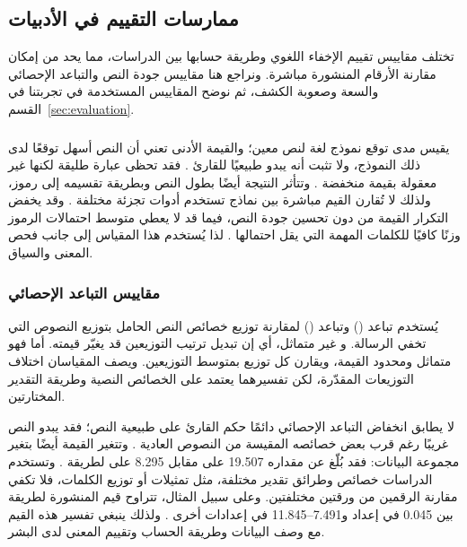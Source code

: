 \subsection{ممارسات التقييم في الأدبيات}
\label{sec:related-rq3}

تختلف مقاييس تقييم الإخفاء اللغوي وطريقة حسابها بين الدراسات، مما يحد من إمكان مقارنة الأرقام المنشورة مباشرة. ونراجع هنا مقاييس جودة النص والتباعد الإحصائي والسعة وصعوبة الكشف، ثم نوضح المقاييس المستخدمة في تجربتنا في القسم~\ref{sec:evaluation}.

\subsubsection{}

يقيس  مدى توقع نموذج لغة لنص معين؛ والقيمة الأدنى تعني أن النص أسهل توقعًا لدى ذلك النموذج، ولا تثبت أنه يبدو طبيعيًا للقارئ \cite{jelinek1977perplexity}. فقد تحظى عبارة طليقة لكنها غير معقولة بقيمة منخفضة \cite{wang2022perplexity}. وتتأثر النتيجة أيضًا بطول النص وبطريقة تقسيمه إلى رموز، ولذلك لا تُقارن القيم مباشرة بين نماذج تستخدم أدوات تجزئة مختلفة \cite{fang2025wrong,morgan2024perplexity}. وقد يخفض التكرار القيمة من دون تحسين جودة النص، فيما قد لا يعطي متوسط احتمالات الرموز وزنًا كافيًا للكلمات المهمة التي يقل احتمالها \cite{wang2022perplexity,fang2025wrong}. لذا يُستخدم هذا المقياس إلى جانب فحص المعنى والسياق.

\subsubsection{مقاييس التباعد الإحصائي}

يُستخدم تباعد  ‏() \cite{1320776d-9e76-337e-a755-73010b6e4b64} وتباعد  ‏() لمقارنة توزيع خصائص النص الحامل بتوزيع النصوص التي تخفي الرسالة. و غير متماثل، أي إن تبديل ترتيب التوزيعين قد يغيّر قيمته. أما  فهو متماثل ومحدود القيمة، ويقارن كل توزيع بمتوسط التوزيعين. ويصف المقياسان اختلاف التوزيعات المقدّرة، لكن تفسيرهما يعتمد على الخصائص النصية وطريقة التقدير المختارتين.

لا يطابق انخفاض التباعد الإحصائي دائمًا حكم القارئ على طبيعية النص؛ فقد يبدو النص غريبًا رغم قرب بعض خصائصه المقيسة من النصوص العادية \cite{yang2020vae}. وتتغير القيمة أيضًا بتغير مجموعة البيانات: فقد بُلّغ عن  مقداره 19.507 على  مقابل 8.295 على  لطريقة  \cite{yang2020vae}. وتستخدم الدراسات خصائص وطرائق تقدير مختلفة، مثل تمثيلات  أو توزيع الكلمات، فلا تكفي مقارنة الرقمين من ورقتين مختلفتين. وعلى سبيل المثال، تتراوح قيم  المنشورة لطريقة  بين 0.045 في إعداد و7.491--11.845 في إعدادات أخرى \cite{kaptchuk2021meteor}. ولذلك ينبغي تفسير هذه القيم مع وصف البيانات وطريقة الحساب وتقييم المعنى لدى البشر.

